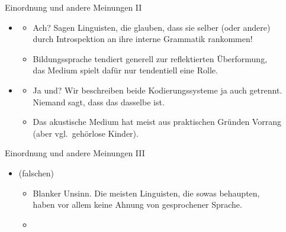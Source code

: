 \begin{frame}
  {Einordnung und andere Meinungen II}
  \pause
  \begin{itemize}[<+->]
    \item {}
      \begin{itemize}[<+->]
        \item \alert{Ach? Sagen Linguisten, die glauben, dass sie selber (oder andere)\\
          durch Introspektion an ihre interne Grammatik rankommen!}
        \item Bildungssprache tendiert generell zur reflektierten \alert{Überformung},\\
          das Medium spielt dafür nur tendentiell eine Rolle.
      \end{itemize}
      \Viertelzeile
    \item {}
      \begin{itemize}[<+->]
        \item \alert{Ja und? Wir beschreiben beide Kodierungssysteme ja auch getrennt.\\
          Niemand sagt, dass das dasselbe ist.}
        \item Das akustische Medium hat meist aus praktischen Gründen Vorrang\\
          (aber vgl.\ \zB gehörlose Kinder).
      \end{itemize}
  \end{itemize}
\end{frame}

\begin{frame}
  {Einordnung und andere Meinungen III}
  \pause
  \begin{itemize}[<+->]
    \item {} (falschen) 
      \begin{itemize}[<+->]
        \item \alert{Blanker Unsinn. Die meisten Linguisten, die sowas behaupten,\\
          haben vor allem keine Ahnung von gesprochener Sprache.}
        \item {}
      \end{itemize}
  \end{itemize}
\end{frame}



